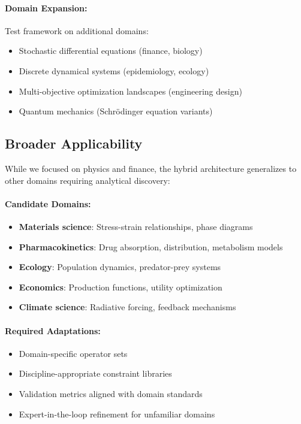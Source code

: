 \documentclass[twoside,11pt]{article}
\begin{document}
\paragraph{Domain Expansion:} Test framework on additional domains:
\begin{itemize}
\item Stochastic differential equations (finance, biology)
\item Discrete dynamical systems (epidemiology, ecology)
\item Multi-objective optimization landscapes (engineering design)
\item Quantum mechanics (Schrödinger equation variants)
\end{itemize}

\subsection{Broader Applicability}

While we focused on physics and finance, the hybrid architecture generalizes to other domains requiring analytical discovery:\citep{koza1994genetic}

\paragraph{Candidate Domains:}
\begin{itemize}
\item \textbf{Materials science}: Stress-strain relationships, phase diagrams
\item \textbf{Pharmacokinetics}: Drug absorption, distribution, metabolism models
\item \textbf{Ecology}: Population dynamics, predator-prey systems
\item \textbf{Economics}: Production functions, utility optimization
\item \textbf{Climate science}: Radiative forcing, feedback mechanisms
\end{itemize}

\paragraph{Required Adaptations:}
\begin{itemize}
\item Domain-specific operator sets
\item Discipline-appropriate constraint libraries
\item Validation metrics aligned with domain standards
\item Expert-in-the-loop refinement for unfamiliar domains
\end{itemize}
\end{document}

